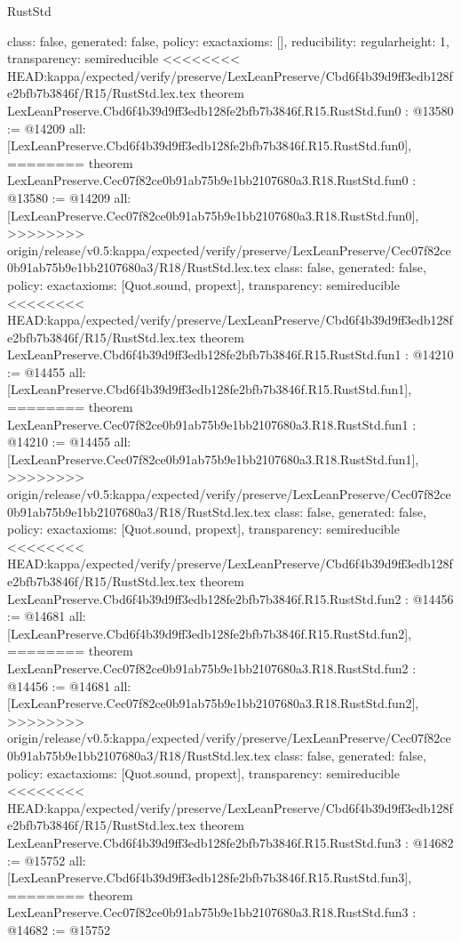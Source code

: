 \begin{lexlean}{RustStd}
\begin{coremodule}
{\begin{coremodule}
{{{  class: false,
  generated: false,
  policy: exact{axioms: []},
  reducibility: regular{height: 1},
  transparency: semireducible
}
<<<<<<<< HEAD:kappa/expected/verify/preserve/LexLeanPreserve/Cbd6f4b39d9ff3edb128fe2bfb7b3846f/R15/RustStd.lex.tex
theorem LexLeanPreserve.Cbd6f4b39d9ff3edb128fe2bfb7b3846f.R15.RustStd.fun0 : @13580 := @14209 {
  all: [LexLeanPreserve.Cbd6f4b39d9ff3edb128fe2bfb7b3846f.R15.RustStd.fun0],
========
theorem LexLeanPreserve.Cec07f82ce0b91ab75b9e1bb2107680a3.R18.RustStd.fun0 : @13580 := @14209 {
  all: [LexLeanPreserve.Cec07f82ce0b91ab75b9e1bb2107680a3.R18.RustStd.fun0],
>>>>>>>> origin/release/v0.5:kappa/expected/verify/preserve/LexLeanPreserve/Cec07f82ce0b91ab75b9e1bb2107680a3/R18/RustStd.lex.tex
  class: false,
  generated: false,
  policy: exact{axioms: [Quot.sound, propext]},
  transparency: semireducible
}
<<<<<<<< HEAD:kappa/expected/verify/preserve/LexLeanPreserve/Cbd6f4b39d9ff3edb128fe2bfb7b3846f/R15/RustStd.lex.tex
theorem LexLeanPreserve.Cbd6f4b39d9ff3edb128fe2bfb7b3846f.R15.RustStd.fun1 : @14210 := @14455 {
  all: [LexLeanPreserve.Cbd6f4b39d9ff3edb128fe2bfb7b3846f.R15.RustStd.fun1],
========
theorem LexLeanPreserve.Cec07f82ce0b91ab75b9e1bb2107680a3.R18.RustStd.fun1 : @14210 := @14455 {
  all: [LexLeanPreserve.Cec07f82ce0b91ab75b9e1bb2107680a3.R18.RustStd.fun1],
>>>>>>>> origin/release/v0.5:kappa/expected/verify/preserve/LexLeanPreserve/Cec07f82ce0b91ab75b9e1bb2107680a3/R18/RustStd.lex.tex
  class: false,
  generated: false,
  policy: exact{axioms: [Quot.sound, propext]},
  transparency: semireducible
}
<<<<<<<< HEAD:kappa/expected/verify/preserve/LexLeanPreserve/Cbd6f4b39d9ff3edb128fe2bfb7b3846f/R15/RustStd.lex.tex
theorem LexLeanPreserve.Cbd6f4b39d9ff3edb128fe2bfb7b3846f.R15.RustStd.fun2 : @14456 := @14681 {
  all: [LexLeanPreserve.Cbd6f4b39d9ff3edb128fe2bfb7b3846f.R15.RustStd.fun2],
========
theorem LexLeanPreserve.Cec07f82ce0b91ab75b9e1bb2107680a3.R18.RustStd.fun2 : @14456 := @14681 {
  all: [LexLeanPreserve.Cec07f82ce0b91ab75b9e1bb2107680a3.R18.RustStd.fun2],
>>>>>>>> origin/release/v0.5:kappa/expected/verify/preserve/LexLeanPreserve/Cec07f82ce0b91ab75b9e1bb2107680a3/R18/RustStd.lex.tex
  class: false,
  generated: false,
  policy: exact{axioms: [Quot.sound, propext]},
  transparency: semireducible
}
<<<<<<<< HEAD:kappa/expected/verify/preserve/LexLeanPreserve/Cbd6f4b39d9ff3edb128fe2bfb7b3846f/R15/RustStd.lex.tex
theorem LexLeanPreserve.Cbd6f4b39d9ff3edb128fe2bfb7b3846f.R15.RustStd.fun3 : @14682 := @15752 {
  all: [LexLeanPreserve.Cbd6f4b39d9ff3edb128fe2bfb7b3846f.R15.RustStd.fun3],
========
theorem LexLeanPreserve.Cec07f82ce0b91ab75b9e1bb2107680a3.R18.RustStd.fun3 : @14682 := @15752 {
}}}}}}}
\end{coremodule}}
\end{coremodule}
\end{lexlean}
